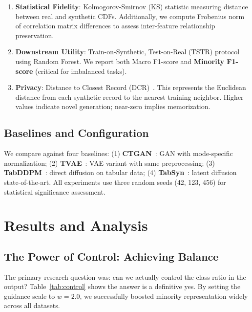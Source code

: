 \documentclass[conference]{IEEEtran}
\begin{document}
\begin{enumerate}
    \item \textbf{Statistical Fidelity}: Kolmogorov-Smirnov (KS) statistic measuring distance between real and synthetic CDFs. Additionally, we compute Frobenius norm of correlation matrix differences to assess inter-feature relationship preservation.
    \item \textbf{Downstream Utility}: Train-on-Synthetic, Test-on-Real (TSTR) protocol using Random Forest. We report both Macro F1-score and \textbf{Minority F1-score} (critical for imbalanced tasks).
    \item \textbf{Privacy}: Distance to Closest Record (DCR)~\cite{stadler2022synthetic}. This represents the Euclidean distance from each synthetic record to the nearest training neighbor. Higher values indicate novel generation; near-zero implies memorization.
\end{enumerate}

\subsection{Baselines and Configuration}
We compare against four baselines: (1) \textbf{CTGAN}~\cite{xu2019ctgan}: GAN with mode-specific normalization; (2) \textbf{TVAE}~\cite{xu2019ctgan}: VAE variant with same preprocessing; (3) \textbf{TabDDPM}~\cite{kotelnikov2023tabddpm}: direct diffusion on tabular data; (4) \textbf{TabSyn}~\cite{zhang2024tabsyn}: latent diffusion state-of-the-art. All experiments use three random seeds (42, 123, 456) for statistical significance assessment.

\section{Results and Analysis}
\vspace{-1mm}

\subsection{The Power of Control: Achieving Balance}
The primary research question was: can we actually control the class ratio in the output? Table~\ref{tab:control} shows the answer is a definitive yes. By setting the guidance scale to $w=2.0$, we successfully boosted minority representation widely across all datasets.
\end{document}
